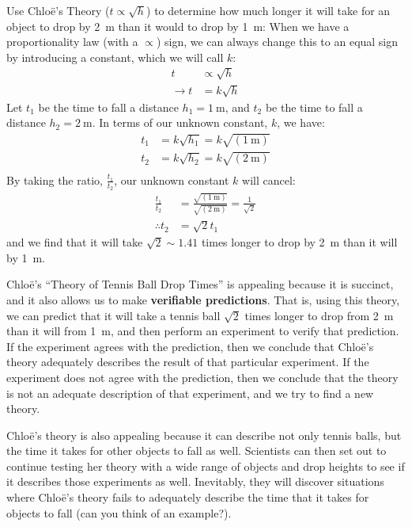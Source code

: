 \begin{example}{Use Chlo\"e's Theory ($t \propto \sqrt{h}$) to determine how much longer it will take for an object to drop by \SI{2}{\meter} than it would to drop by \SI{1}{\meter}:}
When we have a proportionality law (with a $\propto$) sign, we can always change this to an equal sign by introducing a constant, which we will call $k$:
\begin{align*}
t &\propto \sqrt{h} \\
\rightarrow t&=k\sqrt{h}
\end{align*}
Let $t_1$ be the time to fall a distance $h_1=\SI{1}{\meter}$, and $t_2$ be the time to fall a distance $h_2=\SI{2}{\meter}$. In terms of our unknown constant, $k$, we have:
\begin{align*}
t_1 &=k\sqrt{h_1}=k \sqrt{(\SI{1}{\meter})}\\
t_2 &=k\sqrt{h_2}=k \sqrt{(\SI{2}{\meter})}\\
\end{align*}
By taking the ratio, $\frac{t_1}{t_2}$, our unknown constant $k$ will cancel:
\begin{align*}
\frac{t_1}{t_2}&=\frac{\sqrt{(\SI{1}{\meter})}}{\sqrt{(\SI{2}{\meter})}}=\frac{1}{\sqrt 2}\\
\therefore t_2 &= \sqrt{2} t_1
\end{align*}
and we find that it will take $\sqrt{2}\sim 1.41$ times longer to drop by \SI{2}{\meter} than it will by \SI{1}{\meter}.
\end{example}

Chlo\"e's ``Theory of Tennis Ball Drop Times'' is appealing because it is succinct, and it also allows us to make \textbf{verifiable predictions}. That is, using this theory, we can predict that it will take a tennis ball $\sqrt 2$ times longer to drop from \SI{2}{\meter} than it will from \SI{1}{\meter}, and then perform an experiment to verify that prediction. If the experiment agrees with the prediction, then we conclude that Chlo\"e's theory adequately describes the result of that particular experiment. If the experiment does not agree with the prediction, then we conclude that the theory is not an adequate description of that experiment, and we try to find a new theory.

Chlo\"e's theory is also appealing because it can describe not only tennis balls, but the time it takes for other objects to fall as well. Scientists can then set out to continue testing her theory with a wide range of objects and drop heights to see if it describes those experiments as well. Inevitably, they will discover situations where Chlo\"e's theory fails to adequately describe the time that it takes for objects to fall (can you think of an example?).

